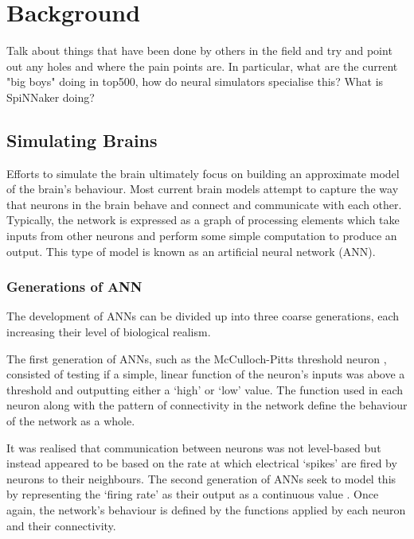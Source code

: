 \chapter{Background}
	\label{chap:background}
	
	Talk about things that have been done by others in the field and try and point
	out any holes and where the pain points are. In particular, what are the
	current "big boys" doing in top500, how do neural simulators specialise this?
	What is SpiNNaker doing?
	
	\section{Simulating Brains}
		
		
		Efforts to simulate the brain ultimately focus on building an approximate
		model of the brain's behaviour. Most current brain models attempt to capture
		the way that neurons in the brain behave and connect and communicate with
		each other. Typically, the network is expressed as a graph of processing
		elements which take inputs from other neurons and perform some simple
		computation to produce an output. This type of model is known as an
		artificial neural network (ANN).
		
		\subsection{Generations of ANN}
			
			The development of ANNs can be divided up into three coarse generations,
			each increasing their level of biological realism.
			
			The first generation of ANNs, such as the McCulloch-Pitts threshold neuron
			\cite{mcculloch43}, consisted of testing if a simple, linear function of
			the neuron's inputs was above a threshold and outputting either a `high'
			or `low' value. The function used in each neuron along with the pattern of
			connectivity in the network define the behaviour of the network as a
			whole.
			
			It was realised that communication between neurons was not level-based but
			instead appeared to be based on the rate at which electrical `spikes' are
			fired by neurons to their neighbours. The second generation of ANNs seek
			to model this by representing the `firing rate' as their output as a
			continuous value \cite{maass97}. Once again, the network's behaviour is
			defined by the functions applied by each neuron and their connectivity.
			

